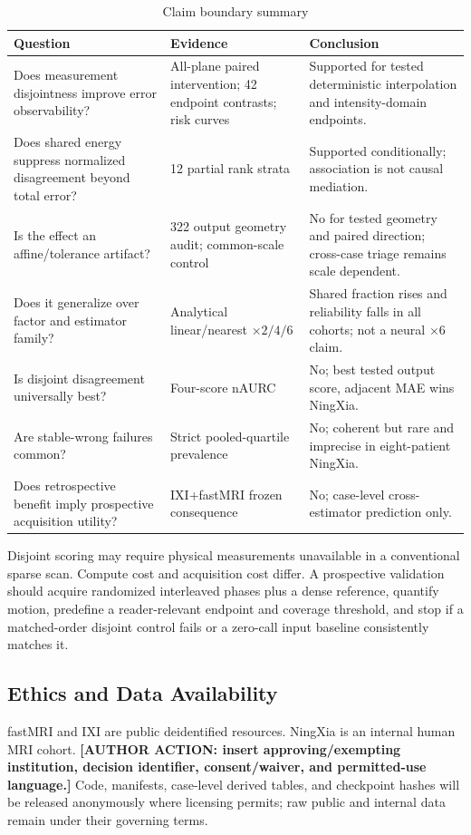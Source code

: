 \documentclass[journal,10pt]{IEEEtran}
\begin{document}
\begin{table}[t]
\caption{Claim boundary summary}
\label{tab:claims}\centering
\begin{tabular}{p{4.2cm}p{4.1cm}p{7.0cm}}
\toprule
Question&Evidence&Conclusion\\
\midrule
Does measurement disjointness improve error observability?&All-plane paired intervention; 42 endpoint contrasts; risk curves&Supported for tested deterministic interpolation and intensity-domain endpoints.\\
Does shared energy suppress normalized disagreement beyond total error?&12 partial rank strata&Supported conditionally; association is not causal mediation.\\
Is the effect an affine/tolerance artifact?&322 output geometry audit; common-scale control&No for tested geometry and paired direction; cross-case triage remains scale dependent.\\
Does it generalize over factor and estimator family?&Analytical linear/nearest $\times2/4/6$&Shared fraction rises and reliability falls in all cohorts; not a neural $\times6$ claim.\\
Is disjoint disagreement universally best?&Four-score nAURC&No; best tested output score, adjacent MAE wins NingXia.\\
Are stable-wrong failures common?&Strict pooled-quartile prevalence&No; coherent but rare and imprecise in eight-patient NingXia.\\
Does retrospective benefit imply prospective acquisition utility?&IXI+fastMRI frozen consequence&No; case-level cross-estimator prediction only.\\
\bottomrule
\end{tabular}
\end{table}

Disjoint scoring may require physical measurements unavailable in a conventional sparse scan. Compute cost and acquisition cost differ. A prospective validation should acquire randomized interleaved phases plus a dense reference, quantify motion, predefine a reader-relevant endpoint and coverage threshold, and stop if a matched-order disjoint control fails or a zero-call input baseline consistently matches it.

\subsection{Ethics and Data Availability}
fastMRI and IXI are public deidentified resources. NingXia is an internal human MRI cohort. \textbf{[AUTHOR ACTION: insert approving/exempting institution, decision identifier, consent/waiver, and permitted-use language.] } Code, manifests, case-level derived tables, and checkpoint hashes will be released anonymously where licensing permits; raw public and internal data remain under their governing terms.
\end{document}
